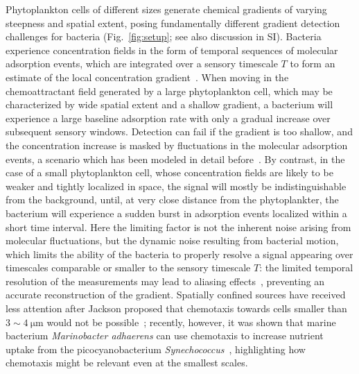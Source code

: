 \documentclass[9pt,twocolumn,twoside]{pnas-new}
\begin{document}
Phytoplankton cells of different sizes generate chemical gradients of varying steepness and spatial extent, posing fundamentally different gradient detection challenges for bacteria (Fig.~\ref{fig:setup}; see also discussion in SI).
Bacteria experience concentration fields in the form of temporal sequences of molecular adsorption events, which are integrated over a sensory timescale $T$ to form an estimate of the local concentration gradient~\cite{berg1977physics}. When moving in the chemoattractant field generated by a large phytoplankton cell, which may be characterized by wide spatial extent and a shallow gradient, a bacterium will experience a large baseline adsorption rate with only a gradual increase over subsequent sensory windows. Detection can fail if the gradient is too shallow, and the concentration increase is masked by fluctuations in the molecular adsorption events, a scenario which has been modeled in detail before~\cite{mora2010limits}.
By contrast, in the case of a small phytoplankton cell, whose concentration fields are likely to be weaker and tightly localized in space, the signal will mostly be indistinguishable from the background, until, at very close distance from the phytoplankter, the bacterium will experience a sudden burst in adsorption events localized within a short time interval.
Here the limiting factor is not the inherent noise arising from molecular fluctuations, but the dynamic noise resulting from bacterial motion, which limits the ability of the bacteria to properly resolve a signal appearing over timescales comparable or smaller to the sensory timescale $T$: the limited temporal resolution of the measurements may lead to aliasing effects~\cite{blackman1958measurement}, preventing an accurate reconstruction of the gradient.
Spatially confined sources have received less attention after Jackson proposed that chemotaxis towards cells smaller than $3\sim\SI{4}{\micro\m}$ would not be possible~\cite{jackson1987simulating}; recently, however, it was shown that marine bacterium \emph{Marinobacter adhaerens} can use chemotaxis to increase nutrient uptake from the picocyanobacterium \emph{Synechococcus}~\cite{raina2023chemotaxis}, highlighting how chemotaxis might be relevant even at the smallest scales.
\end{document}
